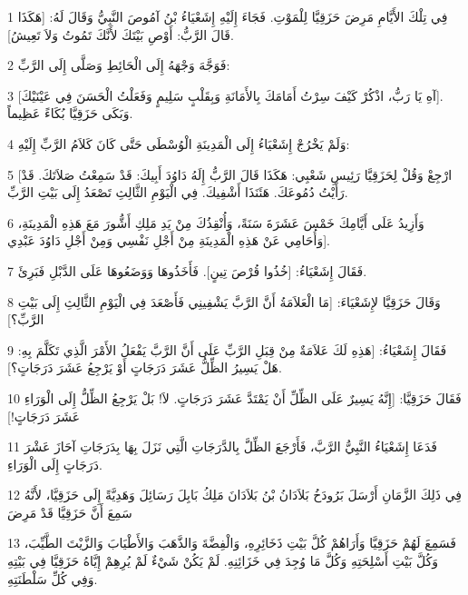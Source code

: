 \par 1 فِي تِلْكَ الأَيَّامِ مَرِضَ حَزَقِيَّا لِلْمَوْتِ. فَجَاءَ إِلَيْهِ إِشَعْيَاءُ بْنُ آمُوصَ النَّبِيُّ وَقَالَ لَهُ: [هَكَذَا قَالَ الرَّبُّ: أَوْصِ بَيْتَكَ لأَنَّكَ تَمُوتُ وَلاَ تَعِيشُ].
\par 2 فَوَجَّهَ وَجْهَهُ إِلَى الْحَائِطِ وَصَلَّى إِلَى الرَّبِّ:
\par 3 [آهِ يَا رَبُّ، اذْكُرْ كَيْفَ سِرْتُ أَمَامَكَ بِالأَمَانَةِ وَبِقَلْبٍ سَلِيمٍ وَفَعَلْتُ الْحَسَنَ فِي عَيْنَيْكَ]. وَبَكَى حَزَقِيَّا بُكَاءً عَظِيماً.
\par 4 وَلَمْ يَخْرُجْ إِشَعْيَاءُ إِلَى الْمَدِينَةِ الْوُسْطَى حَتَّى كَانَ كَلاَمُ الرَّبِّ إِلَيْهِ:
\par 5 [ارْجِعْ وَقُلْ لِحَزَقِيَّا رَئِيسِ شَعْبِي: هَكَذَا قَالَ الرَّبُّ إِلَهُ دَاوُدَ أَبِيكَ: قَدْ سَمِعْتُ صَلاَتَكَ. قَدْ رَأَيْتُ دُمُوعَكَ. هَئَنَذَا أَشْفِيكَ. فِي الْيَوْمِ الثَّالِثِ تَصْعَدُ إِلَى بَيْتِ الرَّبِّ.
\par 6 وَأَزِيدُ عَلَى أَيَّامِكَ خَمْسَ عَشَرَةَ سَنَةً، وَأُنْقِذُكَ مِنْ يَدِ مَلِكِ أَشُّورَ مَعَ هَذِهِ الْمَدِينَةِ، وَأُحَامِي عَنْ هَذِهِ الْمَدِينَةِ مِنْ أَجْلِ نَفْسِي وَمِنْ أَجْلِ دَاوُدَ عَبْدِي].
\par 7 فَقَالَ إِشَعْيَاءُ: [خُذُوا قُرْصَ تِينٍ]. فَأَخَذُوهَا وَوَضَعُوهَا عَلَى الدَّبْلِ فَبَرِئَ.
\par 8 وَقَالَ حَزَقِيَّا لإِشَعْيَاءَ: [مَا الْعَلاَمَةُ أَنَّ الرَّبَّ يَشْفِينِي فَأَصْعَدَ فِي الْيَوْمِ الثَّالِثِ إِلَى بَيْتِ الرَّبِّ؟]
\par 9 فَقَالَ إِشَعْيَاءُ: [هَذِهِ لَكَ عَلاَمَةٌ مِنْ قِبَلِ الرَّبِّ عَلَى أَنَّ الرَّبَّ يَفْعَلُ الأَمْرَ الَّذِي تَكَلَّمَ بِهِ: هَلْ يَسِيرُ الظِّلُّ عَشَرَ دَرَجَاتٍ أَوْ يَرْجِعُ عَشَرَ دَرَجَاتٍ؟].
\par 10 فَقَالَ حَزَقِيَّا: [إِنَّهُ يَسِيرٌ عَلَى الظِّلِّ أَنْ يَمْتَدَّ عَشَرَ دَرَجَاتٍ. لاَ! بَلْ يَرْجِعُ الظِّلُّ إِلَى الْوَرَاءِ عَشَرَ دَرَجَاتٍ!]
\par 11 فَدَعَا إِشَعْيَاءُ النَّبِيُّ الرَّبَّ، فَأَرْجَعَ الظِّلَّ بِالدَّرَجَاتِ الَّتِي نَزَلَ بِهَا بِدَرَجَاتِ آحَازَ عَشْرَ دَرَجَاتٍ إِلَى الْوَرَاءِ.
\par 12 فِي ذَلِكَ الزَّمَانِ أَرْسَلَ بَرُودَخُ بَلاَدَانُ بْنُ بَلاَدَانَ مَلِكُ بَابِلَ رَسَائِلَ وَهَدِيَّةً إِلَى حَزَقِيَّا، لأَنَّهُ سَمِعَ أَنَّ حَزَقِيَّا قَدْ مَرِضَ
\par 13 فَسَمِعَ لَهُمْ حَزَقِيَّا وَأَرَاهُمْ كُلَّ بَيْتِ ذَخَائِرِهِ، وَالْفِضَّةَ وَالذَّهَبَ وَالأَطْيَابَ وَالزَّيْتَ الطَّيِّبَ، وَكُلَّ بَيْتِ أَسْلِحَتِهِ وَكُلَّ مَا وُجِدَ فِي خَزَائِنِهِ. لَمْ يَكُنْ شَيْءٌ لَمْ يُرِهِمْ إِيَّاهُ حَزَقِيَّا فِي بَيْتِهِ وَفِي كُلِّ سَلْطَنَتِهِ.
